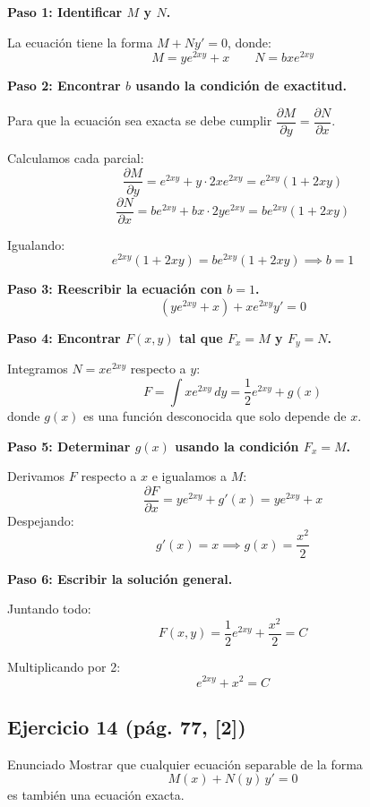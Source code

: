 \begin{respuesta}

\textbf{Paso 1: Identificar $M$ y $N$.}

La ecuación tiene la forma $M + Ny' = 0$, donde:
\[
    M = ye^{2xy} + x \qquad N = bxe^{2xy}
\]

\medskip
\textbf{Paso 2: Encontrar $b$ usando la condición de exactitud.}

Para que la ecuación sea exacta se debe cumplir 
$\dfrac{\partial M}{\partial y} = \dfrac{\partial N}{\partial x}$.

Calculamos cada parcial:
\[
    \frac{\partial M}{\partial y} = e^{2xy} + y \cdot 2x e^{2xy} 
    = e^{2xy}(1 + 2xy)
\]
\[
    \frac{\partial N}{\partial x} = be^{2xy} + bx \cdot 2ye^{2xy} 
    = be^{2xy}(1 + 2xy)
\]

Igualando:
\[
    e^{2xy}(1 + 2xy) = be^{2xy}(1 + 2xy) \implies \boxed{b = 1}
\]

\medskip
\textbf{Paso 3: Reescribir la ecuación con $b = 1$.}
\[
    \left(ye^{2xy} + x\right) + xe^{2xy}y' = 0
\]

\medskip
\textbf{Paso 4: Encontrar $F(x,y)$ tal que $F_x = M$ y $F_y = N$.}

Integramos $N = xe^{2xy}$ respecto a $y$:
\[
    F = \int xe^{2xy}\, dy = \frac{1}{2}e^{2xy} + g(x)
\]
donde $g(x)$ es una función desconocida que solo depende de $x$.

\medskip
\textbf{Paso 5: Determinar $g(x)$ usando la condición $F_x = M$.}

Derivamos $F$ respecto a $x$ e igualamos a $M$:
\[
    \frac{\partial F}{\partial x} = ye^{2xy} + g'(x) = ye^{2xy} + x
\]
Despejando:
\[
    g'(x) = x \implies g(x) = \frac{x^2}{2}
\]

\medskip
\textbf{Paso 6: Escribir la solución general.}

Juntando todo:
\[
    F(x,y) = \frac{1}{2}e^{2xy} + \frac{x^2}{2} = C
\]

Multiplicando por 2:
\[
    \boxed{e^{2xy} + x^2 = C}
\]

\end{respuesta}

\subsection*{Ejercicio 14 \quad\normalfont\small(pág. 77, [2])}

\begin{enunciado}{Enunciado}
    Mostrar que cualquier ecuación separable de la forma
    \[
        M(x) + N(y)\,y' = 0
    \]
    es también una ecuación exacta.
\end{enunciado}

